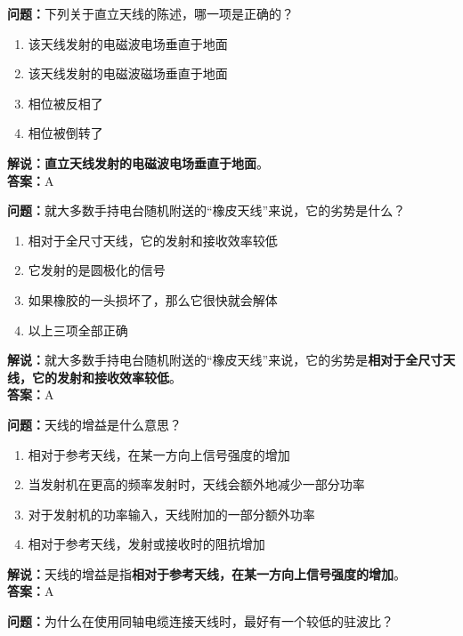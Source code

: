 \textbf{问题：}下列关于直立天线的陈述，哪一项是正确的？

\begin{enumerate}[label=\Alph*), leftmargin=1cm]
	\item 该天线发射的电磁波电场垂直于地面
	\item 该天线发射的电磁波磁场垂直于地面
	\item 相位被反相了
	\item 相位被倒转了
\end{enumerate}

\textbf{解说：}\textbf{直立天线发射的电磁波电场垂直于地面}。\\\textbf{答案：}A%



\textbf{问题：}就大多数手持电台随机附送的“橡皮天线”来说，它的劣势是什么？

\begin{enumerate}[label=\Alph*), leftmargin=1cm]
	\item 相对于全尺寸天线，它的发射和接收效率较低
	\item 它发射的是圆极化的信号
	\item 如果橡胶的一头损坏了，那么它很快就会解体
	\item 以上三项全部正确
\end{enumerate}

\textbf{解说：}就大多数手持电台随机附送的“橡皮天线”来说，它的劣势是\textbf{相对于全尺寸天线，它的发射和接收效率较低}。\\\textbf{答案：}A%



\textbf{问题：}天线的增益是什么意思？

\begin{enumerate}[label=\Alph*), leftmargin=1cm]
	\item 相对于参考天线，在某一方向上信号强度的增加
	\item 当发射机在更高的频率发射时，天线会额外地减少一部分功率
	\item 对于发射机的功率输入，天线附加的一部分额外功率
	\item 相对于参考天线，发射或接收时的阻抗增加
\end{enumerate}

\textbf{解说：}天线的增益是指\textbf{相对于参考天线，在某一方向上信号强度的增加}。\\\textbf{答案：}A%



\textbf{问题：}为什么在使用同轴电缆连接天线时，最好有一个较低的驻波比？

